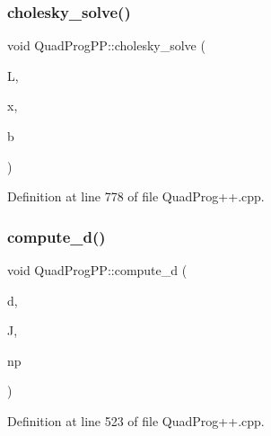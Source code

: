 \subsubsection{\texorpdfstring{cholesky\+\_\+solve()}{cholesky\_solve()}}
{\footnotesize\ttfamily void Quad\+Prog\+P\+P\+::cholesky\+\_\+solve (\begin{DoxyParamCaption}\item[{const Eigen\+::\+Matrix\+Xd \&}]{L,  }\item[{Eigen\+::\+Vector\+Xd \&}]{x,  }\item[{const Eigen\+::\+Vector\+Xd \&}]{b }\end{DoxyParamCaption})}



Definition at line 778 of file Quad\+Prog++.\+cpp.

\hypertarget{namespaceQuadProgPP_aae5048e1bbd76bcc500c30288d1e3ee0}{}\label{namespaceQuadProgPP_aae5048e1bbd76bcc500c30288d1e3ee0} 
\subsubsection{\texorpdfstring{compute\+\_\+d()}{compute\_d()}}
{\footnotesize\ttfamily void Quad\+Prog\+P\+P\+::compute\+\_\+d (\begin{DoxyParamCaption}\item[{Eigen\+::\+Vector\+Xd \&}]{d,  }\item[{const Eigen\+::\+Matrix\+Xd \&}]{J,  }\item[{const Eigen\+::\+Vector\+Xd \&}]{np }\end{DoxyParamCaption})\hspace{0.3cm}{\ttfamily [inline]}}



Definition at line 523 of file Quad\+Prog++.\+cpp.

\hypertarget{namespaceQuadProgPP_aaec5402f2870ee1139e84ab41ef8a3e5}{}\label{namespaceQuadProgPP_aaec5402f2870ee1139e84ab41ef8a3e5} 
